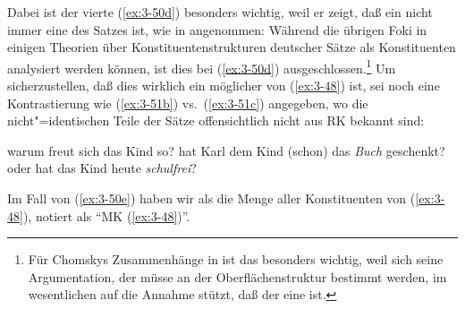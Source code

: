 \documentclass[output=paper]{langsci/langscibook}
\begin{document}
Dabei ist der vierte  (\ref{ex:3-50d}) besonders wichtig, weil er zeigt,
daß ein  nicht immer eine  des Satzes ist, wie
\zb in \citet{Chomsky76a} angenommen: Während die übrigen Foki in
einigen Theorien über Konstituentenstrukturen deutscher Sätze als
Konstituenten analysiert werden können, ist dies bei (\ref{ex:3-50d})
ausgeschlossen.\footnote{\label{fn:3-15}%
	Für Chomskys Zusammenhänge in \citet{Chomsky76a} ist das
  besonders wichtig, weil sich seine Argumentation, der  müsse an der Oberflächenstruktur
  bestimmt werden, im wesentlichen auf die Annahme stützt, daß der  eine  ist.%
}
Um sicherzustellen, daß dies wirklich ein möglicher  von (\ref{ex:3-48}) ist, sei noch eine Kontrastierung wie (\ref{ex:3-51b}) vs.\ (\ref{ex:3-51c}) angegeben, wo die nicht"=identischen Teile der Sätze offensichtlich nicht aus RK bekannt sind:
\begin{exe}
\ex
\label{ex:3-51}
\begin{xlist}
\ex
\label{ex:3-51a}
warum freut sich das Kind so?
\ex
\label{ex:3-51b}
hat Karl dem Kind (schon) das \textit{Buch} geschenkt?
\ex
\label{ex:3-51c}
oder hat das Kind heute \textit{schulfrei}?
\end{xlist}
\end{exe}
Im Fall von (\ref{ex:3-50e}) haben wir als  die Menge aller Konstituenten von (\ref{ex:3-48}), notiert als "`MK (\ref{ex:3-48})"'.
\end{document}
